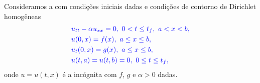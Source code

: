 Consideramos a  com condições iniciais dadas e condições de contorno de Dirichlet homogêneas
\begin{subequations}\label{cap_edp_sec_onda:eq:prob}\hleq
  \begin{align}
    &u_{tt} - \alpha u_{xx} = 0, ~0<t\leq t_f, ~a< x < b, \label{cap_edp_sec_onda:eq:prob_eq}\\
    &u(0,x) = f(x), ~a \leq x \leq b,\label{cap_edp_sec_onda:eq:prob_ci1}\\
    &u_t(0,x) = g(x), ~ a\leq x \leq b,\label{cap_edp_sec_onda:eq:prob_ci2}\\
    &u(t,a) = u(t,b) = 0, ~0 \leq t \leq t_f,\label{cap_edp_sec_onda:eq:prob_bcs}
  \end{align}
\end{subequations}
onde $u = u(t,x)$ é a incógnita com $f$, $g$ e $\alpha>0$ dadas.


